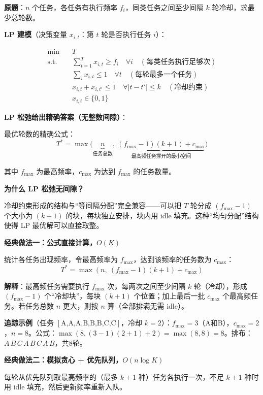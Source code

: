 \documentclass[12pt, a4paper]{ctexart}
\begin{document}
\begin{blackboard}

\textbf{原题}：$n$ 个任务，各任务有执行频率 $f_i$，同类任务之间至少间隔 $k$ 轮冷却，求最少总轮数。

\textbf{LP 建模}（决策变量 $x_{i,t}$：第 $t$ 轮是否执行任务 $i$）：

\begin{align}
\min \quad & T \\
\text{s.t.} \quad & \sum_{t=1}^{T} x_{i,t} \geq f_i \quad \forall i \quad (\text{每类任务执行足够次}) \\
& \sum_{i} x_{i,t} \leq 1 \quad \forall t \quad (\text{每轮最多一个任务}) \\
& x_{i,t} + x_{i,t'} \leq 1 \quad \forall |t - t'| \leq k \quad (\text{冷却约束}) \\
& x_{i,t} \in \{0,1\}
\end{align}

\textbf{LP 松弛给出精确答案（无整数间隙）}：

最优轮数的精确公式：
$$T^* = \max\!\bigl(\underbrace{n}_{\text{任务总数}},\ \underbrace{(f_{\max}-1)(k+1) + c_{\max}}_{\text{最高频任务撑开的最小空间}}\bigr)$$

其中 $f_{\max}$ 为最高频率，$c_{\max}$ 为达到 $f_{\max}$ 的任务数量。

\textbf{为什么 LP 松弛无间隙？}

冷却约束形成的结构与``等间隔分配''完全兼容——可以把 $T$ 轮分成 $(f_{\max}-1)$ 个大小为 $(k+1)$ 的块，每块独立安排，块内用 idle 填充。这种``均匀分配''结构使得 LP 最优解可以直接取整。

\textbf{经典做法一：公式直接计算，$O(K)$}

统计各任务出现频率，令最高频率为 $f_{\max}$，达到该频率的任务数为 $c_{\max}$：
$$T^* = \max(n,\ (f_{\max}-1)(k+1) + c_{\max})$$

\textbf{解释}：最高频任务需要执行 $f_{\max}$ 次，每两次之间至少间隔 $k$ 轮（冷却），形成 $(f_{\max}-1)$ 个``冷却块''，每块 $(k+1)$ 个位置；加上最后一批 $c_{\max}$ 个最高频任务。若任务总数 $n$ 更大，则按 $n$ 算（全部排满无需 idle）。

\textbf{追踪示例}（任务 $[\text{A,A,A,B,B,B,C,C}]$，冷却 $k=2$）：$f_{\max}=3$（A和B），$c_{\max}=2$，$n=8$。公式：$\max(8, (3-1)(2+1)+2) = \max(8, 8) = 8$。排布：$A\,B\,C\,A\,B\,C\,A\,B$，共8轮。

\textbf{经典做法二：模拟贪心 + 优先队列，$O(n\log K)$}

每轮从优先队列取最高频率的（最多 $k+1$ 种）任务各执行一次，不足 $k+1$ 种时用 idle 填充，然后更新频率重新入队。


\end{blackboard}
\end{document}
